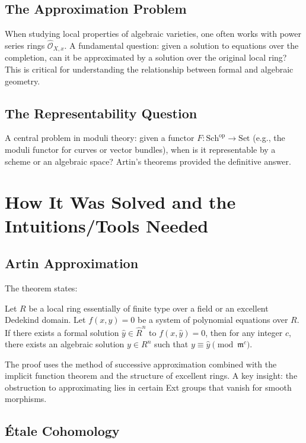 \subsection{The Approximation Problem}

When studying local properties of algebraic varieties, one often works with power series rings $\hat{\mathcal{O}}_{X,x}$. A fundamental question: given a solution to equations over the completion, can it be approximated by a solution over the original local ring? This is critical for understanding the relationship between formal and algebraic geometry.

\subsection{The Representability Question}

A central problem in moduli theory: given a functor $F: \mathrm{Sch}^{\mathrm{op}} \to \mathrm{Set}$ (e.g., the moduli functor for curves or vector bundles), when is it representable by a scheme or an algebraic space? Artin's theorems provided the definitive answer.

\section{How It Was Solved and the Intuitions/Tools Needed}

\subsection{Artin Approximation}

The theorem states:

\begin{theorem}
Let $R$ be a local ring essentially of finite type over a field or an excellent Dedekind domain. Let $f(x,y) = 0$ be a system of polynomial equations over $R$. If there exists a formal solution $\hat{y} \in \hat{R}^n$ to $f(x, \hat{y}) = 0$, then for any integer $c$, there exists an algebraic solution $y \in R^n$ such that $y \equiv \hat{y} \pmod{\mathfrak{m}^c}$.
\end{theorem}

The proof uses the method of successive approximation combined with the implicit function theorem and the structure of excellent rings. A key insight: the obstruction to approximating lies in certain Ext groups that vanish for smooth morphisms.

\subsection{\'Etale Cohomology}


